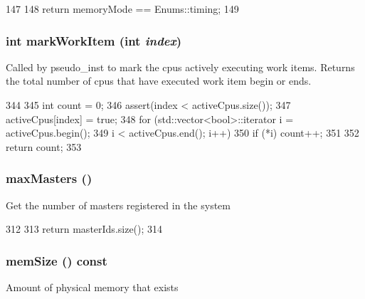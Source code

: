 \begin{DoxyCode}
147                               {
148         return memoryMode == Enums::timing;
149     }
\end{DoxyCode}
\hypertarget{classSystem_ae49314d8f9b44248e8b0577e5cdd0338}{
\subsubsection[{markWorkItem}]{\setlength{\rightskip}{0pt plus 5cm}int markWorkItem (int {\em index})}}
\label{classSystem_ae49314d8f9b44248e8b0577e5cdd0338}
Called by pseudo\_\-inst to mark the cpus actively executing work items. Returns the total number of cpus that have executed work item begin or ends. 


\begin{DoxyCode}
344     {
345         int count = 0;
346         assert(index < activeCpus.size());
347         activeCpus[index] = true;
348         for (std::vector<bool>::iterator i = activeCpus.begin();
349              i < activeCpus.end(); i++) {
350             if (*i) count++;
351         }
352         return count;
353     }
\end{DoxyCode}
\hypertarget{classSystem_a4cd916c36458ce47e9ba4ccbfc75a095}{
\subsubsection[{maxMasters}]{ maxMasters ()}}
\label{classSystem_a4cd916c36458ce47e9ba4ccbfc75a095}
Get the number of masters registered in the system 


\begin{DoxyCode}
312     {
313         return masterIds.size();
314     }
\end{DoxyCode}
\hypertarget{classSystem_a21f1f1db9f5cb71e5e24790fbac5f30f}{
\subsubsection[{memSize}]{ memSize () const}}
\label{classSystem_a21f1f1db9f5cb71e5e24790fbac5f30f}
Amount of physical memory that exists 


